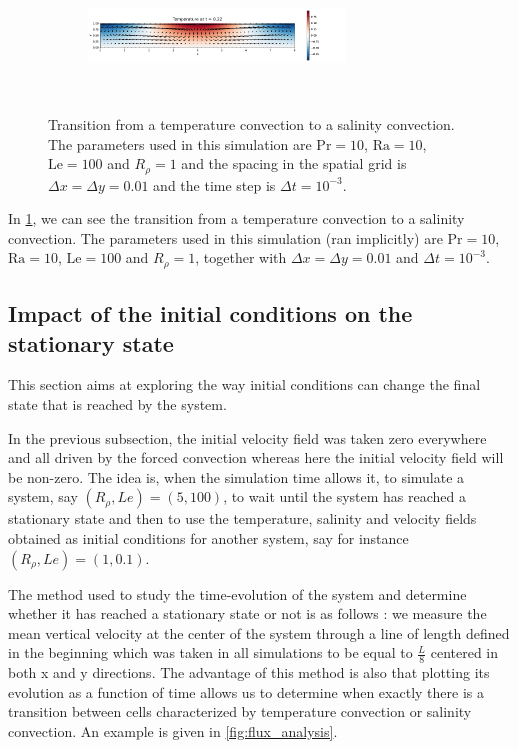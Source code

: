 \documentclass{article}
\def\Ra{\mathrm{Ra}}
\def\Pr{\mathrm{Pr}}
\def\Le{\mathrm{Le}}
\begin{document}
\begin{figure}[ht]
\begin{subfigure}{\textwidth}
  \end{subfigure}\\
  \begin{subfigure}{\textwidth}
    \centering
    \includegraphics[width=0.75\textwidth]{images/TS_6.pdf}
  \end{subfigure}\\
  \caption{Transition from a temperature convection to a salinity convection. The parameters used in this simulation are $\Pr = 10$, $\Ra = 10$, $\Le = 100$ and $R_{\rho} = 1$ and the spacing in the spatial grid is $\Delta x = \Delta y = 0.01$ and the time step is $\Delta t = 10^{-3}$.}
  \label{fig:changeTS}
\end{figure}

In \cref{fig:changeTS}, we can see the transition from a temperature convection to a salinity convection. The parameters used in this simulation (ran implicitly) are $\Pr = 10$, $\Ra = 10$, $\Le = 100$ and $R_{\rho} = 1$, together with $\Delta x = \Delta y = 0.01$ and $\Delta t = 10^{-3}$.

\subsection{Impact of the initial conditions on the stationary state}

This section aims at exploring the way initial conditions can change the final state that is reached by the system.
\par
In the previous subsection, the initial velocity field was taken zero everywhere and all driven by the forced convection whereas here the initial velocity field will be non-zero. The idea is, when the simulation time allows it, to simulate a system, say $(R_{\rho},Le) = (5,100)$, to wait until the system has reached a stationary state and then to use the temperature, salinity and velocity fields obtained as initial conditions for another system, say for instance $(R_{\rho},Le) = (1,0.1)$.
\par
The method used to study the time-evolution of the system and determine whether it has reached a stationary state or not is as follows : we measure the mean vertical velocity at the center of the system through a line of length defined in the beginning which was taken in all simulations to be equal to $\frac{L}{8}$ centered in both x and y directions. The advantage of this method is also that plotting its evolution as a function of time allows us to determine when exactly there is a transition between cells characterized by temperature convection or salinity convection. An example is given in \cref{fig:flux_analysis}.
\end{document}
